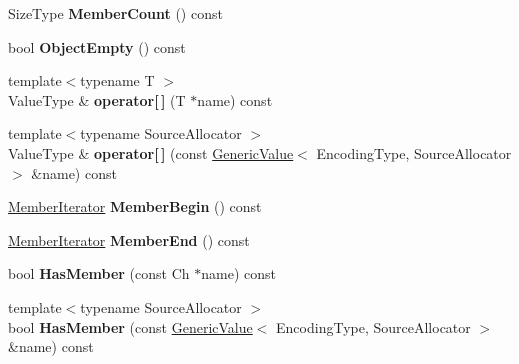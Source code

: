 \begin{DoxyCompactItemize}
\item 
Size\+Type {\bfseries Member\+Count} () const \hypertarget{class_generic_object_ab3772740b811ed417924cebdace1d190}{}\label{class_generic_object_ab3772740b811ed417924cebdace1d190}

\item 
bool {\bfseries Object\+Empty} () const \hypertarget{class_generic_object_a410e5dfd7fa047852ecb4b719a74f842}{}\label{class_generic_object_a410e5dfd7fa047852ecb4b719a74f842}

\item 
{\footnotesize template$<$typename T $>$ }\\Value\+Type \& {\bfseries operator\mbox{[}$\,$\mbox{]}} (T $\ast$name) const \hypertarget{class_generic_object_af3db47f1615353d0c5ce974c2fbe7885}{}\label{class_generic_object_af3db47f1615353d0c5ce974c2fbe7885}

\item 
{\footnotesize template$<$typename Source\+Allocator $>$ }\\Value\+Type \& {\bfseries operator\mbox{[}$\,$\mbox{]}} (const \hyperlink{class_generic_value}{Generic\+Value}$<$ Encoding\+Type, Source\+Allocator $>$ \&name) const \hypertarget{class_generic_object_aac0937f20bfdc94380641bb02cefbf98}{}\label{class_generic_object_aac0937f20bfdc94380641bb02cefbf98}

\item 
\hyperlink{class_generic_member_iterator}{Member\+Iterator} {\bfseries Member\+Begin} () const \hypertarget{class_generic_object_abf56b2ac9cface0dffd21b541acb9511}{}\label{class_generic_object_abf56b2ac9cface0dffd21b541acb9511}

\item 
\hyperlink{class_generic_member_iterator}{Member\+Iterator} {\bfseries Member\+End} () const \hypertarget{class_generic_object_a7dedae79a478db0aeb4e01df4c788f3a}{}\label{class_generic_object_a7dedae79a478db0aeb4e01df4c788f3a}

\item 
bool {\bfseries Has\+Member} (const Ch $\ast$name) const \hypertarget{class_generic_object_a545cbb3d1e99a48fd7a40ebeac1d10da}{}\label{class_generic_object_a545cbb3d1e99a48fd7a40ebeac1d10da}

\item 
{\footnotesize template$<$typename Source\+Allocator $>$ }\\bool {\bfseries Has\+Member} (const \hyperlink{class_generic_value}{Generic\+Value}$<$ Encoding\+Type, Source\+Allocator $>$ \&name) const \hypertarget{class_generic_object_a946712fa1b4fc9ab551a63d17d671f47}{}\label{class_generic_object_a946712fa1b4fc9ab551a63d17d671f47}


\end{DoxyCompactItemize}
